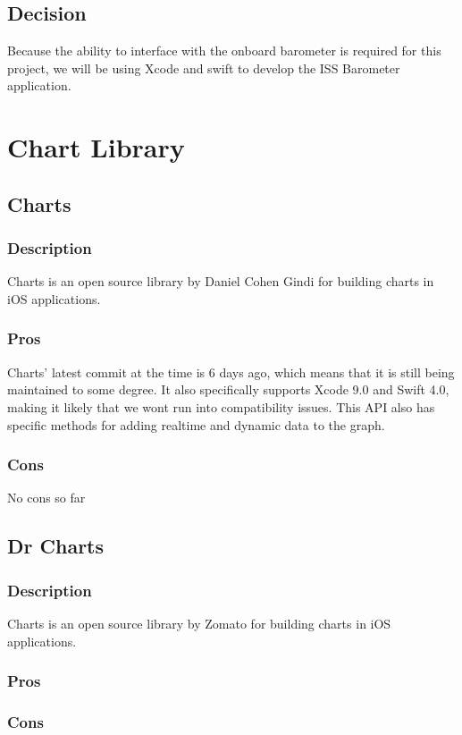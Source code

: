 \documentclass[onecolumn, draftclsnofoot,10pt, compsoc]{IEEEtran}
\begin{document}
\subsection{Decision}
Because the ability to interface with the onboard barometer is required for this project, we will be using Xcode and swift to develop the ISS Barometer application.

\section{Chart Library}
\subsection{Charts}
\subsubsection*{Description}
Charts is an open source library by Daniel Cohen Gindi for building charts in iOS applications.
\subsubsection*{Pros}
Charts' latest commit at the time is 6 days ago, which means that it is still being maintained to some degree.
It also specifically supports Xcode 9.0 and Swift 4.0, making it likely that we wont run into compatibility issues.
This API also has specific methods for adding realtime and dynamic data to the graph.

\subsubsection*{Cons}
No cons so far

\subsection{Dr Charts}
\subsubsection*{Description}
Charts is an open source library by Zomato for building charts in iOS applications.
\subsubsection*{Pros}
\subsubsection*{Cons}
\end{document}
